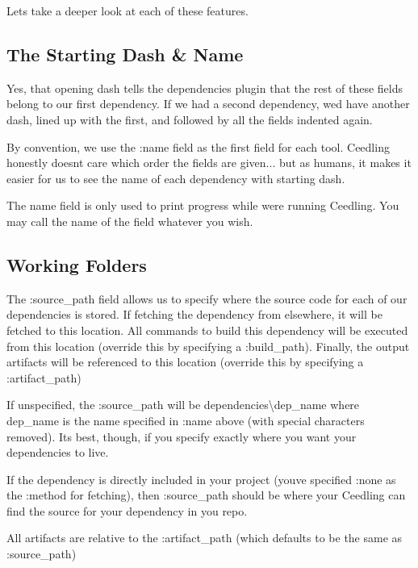 Let\textquotesingle{}s take a deeper look at each of these features.

\subsection*{The Starting Dash \& Name }

Yes, that opening dash tells the dependencies plugin that the rest of these fields belong to our first dependency. If we had a second dependency, we\textquotesingle{}d have another dash, lined up with the first, and followed by all the fields indented again.

By convention, we use the {\ttfamily \+:name} field as the first field for each tool. Ceedling honestly doesn\textquotesingle{}t care which order the fields are given... but as humans, it makes it easier for us to see the name of each dependency with starting dash.

The name field is only used to print progress while we\textquotesingle{}re running Ceedling. You may call the name of the field whatever you wish.

\subsection*{Working Folders }

The {\ttfamily \+:source\+\_\+path} field allows us to specify where the source code for each of our dependencies is stored. If fetching the dependency from elsewhere, it will be fetched to this location. All commands to build this dependency will be executed from this location (override this by specifying a {\ttfamily \+:build\+\_\+path}). Finally, the output artifacts will be referenced to this location (override this by specifying a {\ttfamily \+:artifact\+\_\+path})

If unspecified, the {\ttfamily \+:source\+\_\+path} will be {\ttfamily dependencies\textbackslash{}dep\+\_\+name} where {\ttfamily dep\+\_\+name} is the name specified in {\ttfamily \+:name} above (with special characters removed). It\textquotesingle{}s best, though, if you specify exactly where you want your dependencies to live.

If the dependency is directly included in your project (you\textquotesingle{}ve specified {\ttfamily \+:none} as the {\ttfamily \+:method} for fetching), then {\ttfamily \+:source\+\_\+path} should be where your Ceedling can find the source for your dependency in you repo.

All artifacts are relative to the {\ttfamily \+:artifact\+\_\+path} (which defaults to be the same as {\ttfamily \+:source\+\_\+path})

